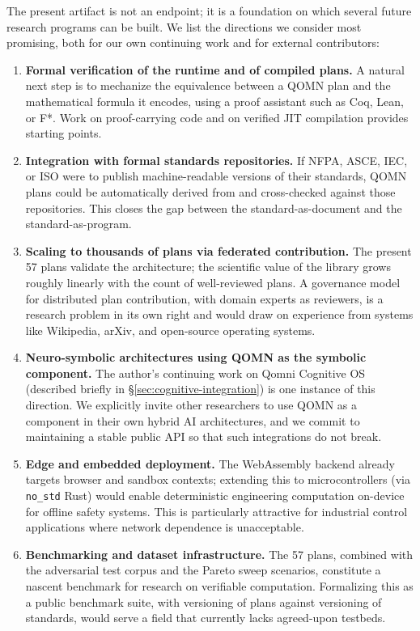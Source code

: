 \documentclass[11pt,a4paper]{article}
\begin{document}
\begin{enumerate}[leftmargin=*]
The present artifact is not an endpoint; it is a foundation on which several future research programs can be built. We list the directions we consider most promising, both for our own continuing work and for external contributors:

\begin{enumerate}[leftmargin=*]
\item \textbf{Formal verification of the runtime and of compiled plans.} A natural next step is to mechanize the equivalence between a QOMN plan and the mathematical formula it encodes, using a proof assistant such as Coq, Lean, or F*. Work on proof-carrying code and on verified JIT compilation provides starting points.
\item \textbf{Integration with formal standards repositories.} If NFPA, ASCE, IEC, or ISO were to publish machine-readable versions of their standards, QOMN plans could be automatically derived from and cross-checked against those repositories. This closes the gap between the standard-as-document and the standard-as-program.
\item \textbf{Scaling to thousands of plans via federated contribution.} The present 57 plans validate the architecture; the scientific value of the library grows roughly linearly with the count of well-reviewed plans. A governance model for distributed plan contribution, with domain experts as reviewers, is a research problem in its own right and would draw on experience from systems like Wikipedia, arXiv, and open-source operating systems.
\item \textbf{Neuro-symbolic architectures using QOMN as the symbolic component.} The author's continuing work on Qomni Cognitive OS (described briefly in \S\ref{sec:cognitive-integration}) is one instance of this direction. We explicitly invite other researchers to use QOMN as a component in their own hybrid AI architectures, and we commit to maintaining a stable public API so that such integrations do not break.
\item \textbf{Edge and embedded deployment.} The WebAssembly backend already targets browser and sandbox contexts; extending this to microcontrollers (via \texttt{no\_std} Rust) would enable deterministic engineering computation on-device for offline safety systems. This is particularly attractive for industrial control applications where network dependence is unacceptable.
\item \textbf{Benchmarking and dataset infrastructure.} The 57 plans, combined with the adversarial test corpus and the Pareto sweep scenarios, constitute a nascent benchmark for research on verifiable computation. Formalizing this as a public benchmark suite, with versioning of plans against versioning of standards, would serve a field that currently lacks agreed-upon testbeds.
\end{enumerate}


\end{enumerate}
\end{document}
